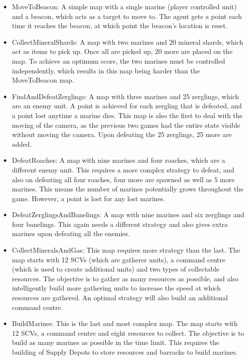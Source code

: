 \begin{itemize}
    \item MoveToBeacon: A simple map with a single marine (player controlled
        unit) and a beacon, which acts as a target to move to. The agent gets
        a point each time it reaches the beacon, at which point the beacon's
        location is reset.
    \item CollectMineralShards: A map with two marines and 20 mineral shards,
        which act as items to pick up. Once all are picked up, 20 more are
        placed on the map. To achieve an optimum score, the two marines must
        be controlled independently, which results in this map being
        harder than the MoveToBeacon map.
    \item FindAndDefeatZerglings: A map with three marines and 25 zerglings,
        which are an enemy unit. A point is achieved for each zergling that
        is defeated, and a point lost anytime a marine dies. This map
        is also the first to deal with the moving of the camera, as the previous
        two games had the entire state visible without moving the camera.
        Upon defeating the 25 zerglings, 25 more are added.
    \item DefeatRoaches: A map with nine marines and four roaches, which are a
        different enemy unit. This requires a more complex strategy to defeat,
        and also on defeating all four roaches, four more are spawned as well as 5
        more marines. This means the number of marines potentially grows
        throughout the game. However, a point is lost for any lost marines.
    \item DefeatZerglingsAndBanelings: A map with nine marines and six zerglings
        and four banelings. This again needs a different strategy and also gives
        extra marines upon defeating all the enemies.
    \item CollectMineralsAndGas: This map requires more strategy than the last.
        The map starts with 12 SCVs (which are gatherer units), a command centre
        (which is used to create additional units) and two types of collectable
        resources. The objective is to gather as many resources as possible, and
        also intelligently build more gathering units to increase the
        speed at which resources are gathered. An optimal strategy will also
        build an additional command centre.
    \item BuildMarines: This is the last and most complex map. The map starts
        with 12 SCVs, a command centre and eight resources to collect. The
        objective is to build as many marines as possible in the time limit.
        This requires the building of Supply Depots to store resources and
        barracks to build marines.
\end{itemize}

